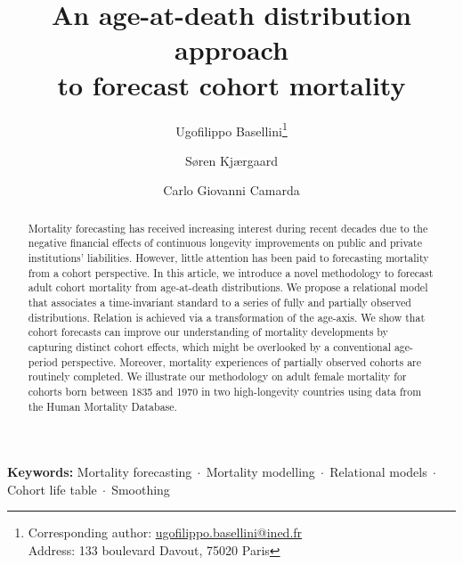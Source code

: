 \documentclass[11pt, a4paper]{article}
\begin{document}
	
	
	\title{An age-at-death distribution approach \\ to forecast cohort mortality}	
	
	\author[1,2]{Ugofilippo Basellini\thanks{Corresponding author: \url{ugofilippo.basellini@ined.fr}\\
	\hspace*{1.8em}Address: 133 boulevard Davout, 75020 Paris}}
	\author[2]{S{\o}ren Kj{\ae}rgaard}
	\author[1]{Carlo Giovanni Camarda}
	
	\maketitle 
 
\begin{abstract}

Mortality forecasting has received increasing interest during recent decades due to the negative financial effects of continuous longevity improvements on public and private institutions' liabilities. However, little attention has been paid to forecasting mortality from a cohort perspective. In this article, we introduce a novel methodology to forecast adult cohort mortality from age-at-death distributions. We propose a relational model that associates a time-invariant standard to a series of fully and partially observed distributions. Relation is achieved via a transformation of the age-axis. We show that cohort forecasts can improve our understanding of mortality developments by capturing distinct cohort effects, which might be overlooked by a conventional age-period perspective. Moreover, mortality experiences of partially observed cohorts are routinely completed. We illustrate our methodology on adult female mortality for cohorts born between 1835 and 1970 in two high-longevity countries using data from the Human Mortality Database.

\end{abstract}

\noindent \textbf{Keywords:} Mortality forecasting$\;\cdot\;$Mortality modelling$\;\cdot\;$Relational models$\;\cdot\;$Cohort life table$\;\cdot\;$Smoothing	
\end{document}
